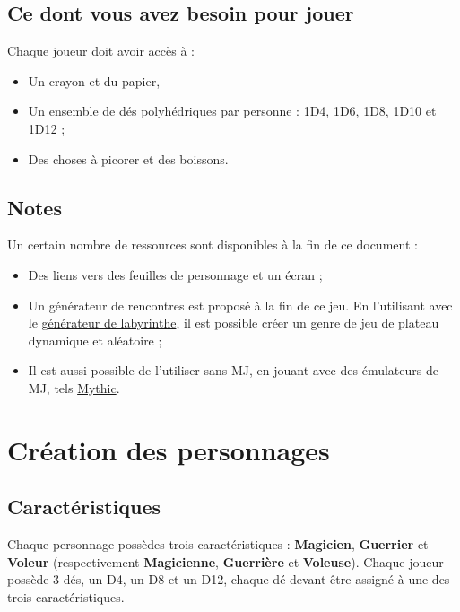 \documentclass[a4paper, 11pt, twoside]{article}
\begin{document}
\subsection{Ce dont vous avez besoin pour jouer}
\label{sec:orgfbeed6b}

Chaque joueur doit avoir accès à :
\begin{itemize}
\item Un crayon et du papier,
\item Un ensemble de dés polyhédriques par personne : 1D4, 1D6, 1D8, 1D10 et 1D12 ;
\item Des choses à picorer et des boissons.
\end{itemize}

\subsection{Notes}
\label{sec:orgc9c854b}

Un certain nombre de ressources sont disponibles à la fin de ce document :
\begin{itemize}
\item Des liens vers des feuilles de personnage et un écran ;
\item Un générateur de rencontres est proposé à la fin de ce jeu. En l'utilisant avec le \href{https://github.com/orey/jdr/tree/master/G\%25C3\%25A9n\%25C3\%25A9rateurLabyrinthe}{générateur de labyrinthe}, il est possible créer un genre de jeu de plateau dynamique et aléatoire ;
\item Il est aussi possible de l'utiliser sans MJ, en jouant avec des émulateurs de MJ, tels \href{https://github.com/orey/jdr/tree/master/Mythic-fr}{Mythic}.
\end{itemize}

\section{Création des personnages}
\label{sec:orgf0fc546}
\subsection{Caractéristiques}
\label{sec:org2a7614c}

Chaque personnage possèdes trois caractéristiques : \textbf{Magicien}, \textbf{Guerrier} et \textbf{Voleur} (respectivement \textbf{Magicienne}, \textbf{Guerrière} et \textbf{Voleuse}). Chaque joueur possède 3 dés, un D4, un D8 et un D12, chaque dé devant être assigné à une des trois caractéristiques. 
\end{document}
